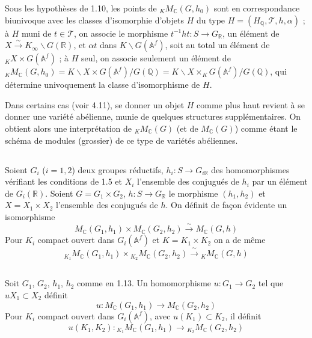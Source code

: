 \documentclass[11pt]{amsart}
\theoremstyle{plain}
\theoremstyle{definition}
\newcommand{\QQ}{\mathbb{Q}}
\newcommand{\RR}{\mathbb{R}}
\newcommand{\AAf}{\mathbb{A}^f}
\newcommand{\MC}{M_{\mathbb{C}}}
\begin{document}
Sous les hypoth\`eses de 1.10, les points de ${}_K \MC(G,h_0)$ sont en correspondance biunivoque avec les classes d'isomorphie d'objets $H$ du type $H = (H_{\QQ}, \mathcal{T}, h, \alpha)$ ; \`a $H$ muni de $t \in \mathcal{T}$, on associe le morphisme $t^{-1} h t : S \to G_{\RR}$, un \'el\'ement de $X \xrightarrow{\sim} K_\infty \backslash G(\RR)$, et $\alpha t$ dans $K \backslash G(\AAf)$, soit au total un \'el\'ement de ${}_K X \times G(\AAf)$ ; \`a $H$ seul, on associe seulement un \'el\'ement de ${}_K \MC(G,h_0) = K \backslash X \times G(\AAf)/G(\QQ) = K \backslash X \times_K G(\AAf)/G(\QQ)$, qui d\'etermine univoquement la classe d'isomorphisme de $H$.

Dans certains cas (voir 4.11), se donner un objet $H$ comme plus haut revient \`a se donner une vari\'et\'e ab\'elienne, munie de quelques structures suppl\'ementaires. On obtient alors une interpr\'etation de ${}_K \MC(G)$ (et de $\MC(G)$) comme \'etant le sch\'ema de modules (grossier) de ce type de vari\'et\'es ab\'eliennes.

\subsection{}

Soient $G_i$ ($i = 1, 2$) deux groupes r\'eductifs, $h_i : S \to G_{i\RR}$ des homomorphismes v\'erifiant les conditions de 1.5 et $X_i$ l'ensemble des conjugu\'es de $h_i$ par un \'el\'ement de $G_i(\RR)$. Soient $G = G_1 \times G_2$, $h : S \to G_{\RR}$ le morphisme $(h_1, h_2)$ et $X = X_1 \times X_2$ l'ensemble des conjugu\'es de $h$. On d\'efinit de fa\c con \'evidente un isomorphisme
\begin{equation}\label{eq:1.13.1}
\MC(G_1, h_1) \times \MC(G_2, h_2) \xrightarrow{\;\sim\;} \MC(G,h)
\end{equation}
Pour $K_i$ compact ouvert dans $G_i(\AAf)$ et $K = K_1 \times K_2$ on a de m\^eme
\begin{equation}\label{eq:1.13.2}
{}_{K_1} \MC(G_1, h_1) \times {}_{K_2} \MC(G_2, h_2) \xrightarrow{\;\sim\;} {}_K \MC(G,h)
\end{equation}

\subsection{}

Soit $G_1$, $G_2$, $h_1$, $h_2$ comme en 1.13. Un homomorphisme $u : G_1 \to G_2$ tel que $u X_1 \subset X_2$ d\'efinit
\begin{equation}\label{eq:1.14.1}
u : \MC(G_1, h_1) \longrightarrow \MC(G_2, h_2)
\end{equation}
Pour $K_i$ compact ouvert dans $G_i(\AAf)$, avec $u(K_1) \subset K_2$, il d\'efinit
\begin{equation}\label{eq:1.14.2}
u(K_1, K_2) : {}_{K_1} \MC(G_1, h_1) \longrightarrow {}_{K_2} \MC(G_2, h_2)
\end{equation}
\end{document}
